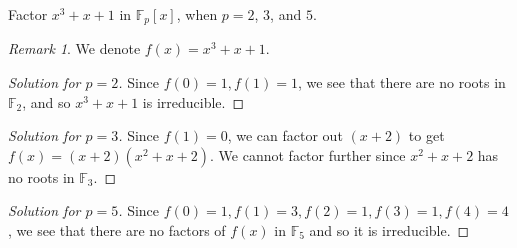 \documentclass[12pt]{article}
\theoremstyle{remark}
\newtheorem*{remark}{Remark}
\begin{document}
\begin{problem}
  Factor $x^3+x+1$ in $\mathbb{F}_p[x]$, when $p = 2$, $3$, and $5$.
\end{problem}
\begin{remark}
  We denote $f(x) = x^3+x+1$.
\end{remark}
\begin{proof}[Solution for $p=2$]
  Since $f(0) = 1, f(1) = 1$, we see that there are no roots in $\mathbb{F}_2$, and so $x^3+x+1$ is irreducible.
\end{proof}
\begin{proof}[Solution for $p=3$]
  Since $f(1)=0$, we can factor out $(x+2)$ to get $f(x) = (x+2)(x^2+x+2)$. We cannot factor further since $x^2+x+2$ has no roots in $\mathbb{F}_3$.
\end{proof}
\begin{proof}[Solution for $p=5$]
  Since $f(0) = 1, f(1) = 3, f(2) = 1, f(3) = 1, f(4) = 4$, we see that there are no factors of $f(x)$ in $\mathbb{F}_5$ and so it is irreducible.
\end{proof}
\end{document}
